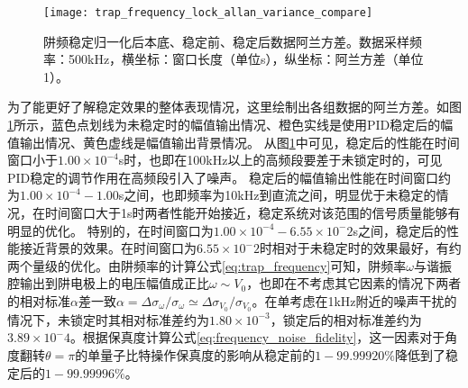 \begin{figure}
    \centering
    \caption[阱频稳定归一化后本底、稳定前、稳定后数据阿兰方差。]{阱频稳定归一化后本底、稳定前、稳定后数据阿兰方差。数据采样频率：500kHz，横坐标：窗口长度（单位s），纵坐标：阿兰方差（单位1）。\label{fig:trap_frequency_lock_allan_variance_compare}}
    \texttt{[image: trap\_frequency\_lock\_allan\_variance\_compare]}
\end{figure}


为了能更好了解稳定效果的整体表现情况，这里绘制出各组数据的阿兰方差。如图\ref{fig:trap_frequency_lock_allan_variance_compare}所示，蓝色点划线为未稳定时的幅值输出情况、橙色实线是使用PID稳定后的幅值输出情况、黄色虚线是幅值输出背景情况。
从图\ref{fig:trap_frequency_lock_allan_variance_compare}中可见，稳定后的性能在时间窗口小于$1.00\times 10^{-4}$s时，也即在100kHz以上的高频段要差于未锁定时的，可见PID稳定的调节作用在高频段引入了噪声。
稳定后的幅值输出性能在时间窗口约为$1.00\times 10^{-4}-1.00$s之间，也即频率为10kHz到直流之间，明显优于未稳定的情况，在时间窗口大于1s时两者性能开始接近，稳定系统对该范围的信号质量能够有明显的优化。
特别的，在时间窗口为$1.00\times 10^{-4}-6.55\times 10^-2$s之间，稳定后的性能接近背景的效果。在时间窗口为$6.55\times 10^-2$时相对于未稳定时的效果最好，有约两个量级的优化。由阱频率的计算公式\eqref{eq:trap_frequency}可知，阱频率$\omega$与谐振腔输出到阱电极上的电压幅值成正比$\omega\sim V_0$，也即在不考虑其它因素的情况下两者的相对标准$\alpha$差一致$\alpha=\Delta\sigma_{\omega}/\sigma_{\omega}\simeq\Delta\sigma_{V_0}/\sigma_{V_0}$。在单考虑在1kHz附近的噪声干扰的情况下，未锁定时其相对标准差约为$1.80\times10^{-3}$，锁定后的相对标准差约为$3.89\times10^-4$。根据保真度计算公式\eqref{eq:frequency_noise_fidelity}，这一因素对于角度翻转$\theta=\pi$的单量子比特操作保真度的影响从稳定前的$1-99.99920\%$降低到了稳定后的$1-99.99996\%$。







